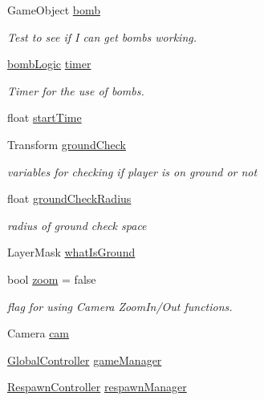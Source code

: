 \begin{DoxyCompactItemize}
Game\+Object \hyperlink{class_player_movement_a97e6c77c213a7631791776290199d532}{bomb}
\begin{DoxyCompactList}\small\item\em Test to see if I can get bombs working. \end{DoxyCompactList}\item 
\hyperlink{classbomb_logic}{bomb\+Logic} \hyperlink{class_player_movement_a5ea646039fd085e5c19acef918f24a21}{timer}
\begin{DoxyCompactList}\small\item\em Timer for the use of bombs. \end{DoxyCompactList}\item 
float \hyperlink{class_player_movement_ae6959aebc17336198f7eb270f21e2195}{start\+Time}
\item 
Transform \hyperlink{class_player_movement_a4c733d8e1fcc9ffd7223ac3182b380f5}{ground\+Check}
\begin{DoxyCompactList}\small\item\em variables for checking if player is on ground or not \end{DoxyCompactList}\item 
float \hyperlink{class_player_movement_a14516da52e9f1e37eea97c98afed9ff3}{ground\+Check\+Radius}
\begin{DoxyCompactList}\small\item\em radius of ground check space \end{DoxyCompactList}\item 
Layer\+Mask \hyperlink{class_player_movement_a04b4dc5a83828e9fefcfe8acbf5de276}{what\+Is\+Ground}
\item 
bool \hyperlink{class_player_movement_ae0fb74ddab994fb7627c7561629a8982}{zoom} = false
\begin{DoxyCompactList}\small\item\em flag for using Camera Zoom\+In/\+Out functions. \end{DoxyCompactList}\item 
Camera \hyperlink{class_player_movement_a345feead60bc04aeb3bf54f198823097}{cam}
\item 
\hyperlink{class_global_controller}{Global\+Controller} \hyperlink{class_player_movement_adb2c84510e5bf27967dcff5bdfdf80d4}{game\+Manager}
\item 
\hyperlink{class_respawn_controller}{Respawn\+Controller} \hyperlink{class_player_movement_a9669ec66c625ff5409f8fb6be21fef12}{respawn\+Manager}
\end{DoxyCompactItemize}


